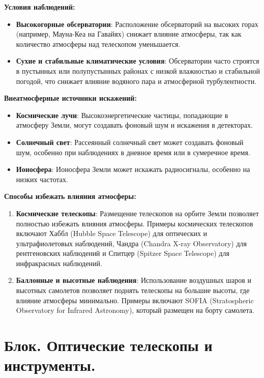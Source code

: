 \documentclass[12pt]{article}
\begin{document}
	\textbf{Условия наблюдений:}
	\begin{itemize}
		\item \textbf{Высокогорные обсерватории}: Расположение обсерваторий на высоких горах (например, Мауна-Кеа на Гавайях) снижает влияние атмосферы, так как количество атмосферы над телескопом уменьшается.
		\item \textbf{Сухие и стабильные климатические условия}: Обсерватории часто строятся в пустынных или полупустынных районах с низкой влажностью и стабильной погодой, что снижает влияние водяного пара и атмосферной турбулентности.
	\end{itemize}
	
	\textbf{Внеатмосферные источники искажений:}
	\begin{itemize}
		\item \textbf{Космические лучи}: Высокоэнергетические частицы, попадающие в атмосферу Земли, могут создавать фоновый шум и искажения в детекторах.
		\item \textbf{Солнечный свет}: Рассеянный солнечный свет может создавать фоновый шум, особенно при наблюдениях в дневное время или в сумеречное время.
		\item \textbf{Ионосфера}: Ионосфера Земли может искажать радиосигналы, особенно на низких частотах.
	\end{itemize}
	
	\textbf{Способы избежать влияния атмосферы:}
	\begin{enumerate}
		\item \textbf{Космические телескопы}: Размещение телескопов на орбите Земли позволяет полностью избежать влияния атмосферы. Примеры космических телескопов включают Хаббл (Hubble Space Telescope) для оптических и ультрафиолетовых наблюдений, Чандра (Chandra X-ray Observatory) для рентгеновских наблюдений и Спитцер (Spitzer Space Telescope) для инфракрасных наблюдений.
		\item \textbf{Баллонные и высотные наблюдения}: Использование воздушных шаров и высотных самолетов позволяет поднять телескопы на большие высоты, где влияние атмосферы минимально. Примеры включают SOFIA (Stratospheric Observatory for Infrared Astronomy), который размещен на борту самолета.
	\end{enumerate}
	
	\section{Блок. Оптические телескопы и инструменты.}
\end{document}
